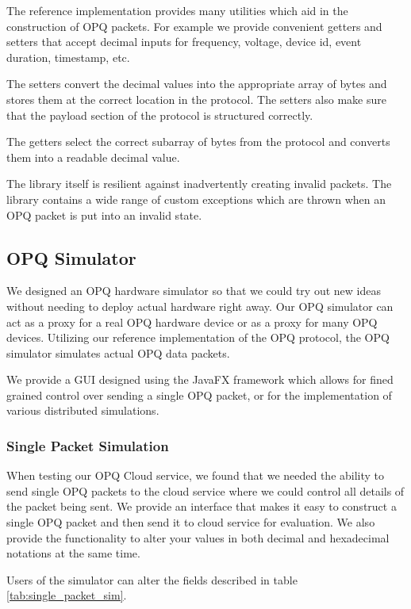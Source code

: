 \documentclass[11pt]{article}
\begin{document}
The reference implementation provides many utilities which aid in the construction of OPQ packets. For example we provide convenient getters and setters that accept decimal inputs for frequency, voltage, device id, event duration, timestamp, etc.

The setters convert the decimal values into the appropriate array of bytes and stores them at the correct location in the protocol. The setters also make sure that the payload section of the protocol is structured correctly. 

The getters select the correct subarray of bytes from the protocol and converts them into a readable decimal value.

The library itself is resilient against inadvertently creating invalid packets. The library contains a wide range of custom exceptions which are thrown when an OPQ packet is put into an invalid state.

\subsection{OPQ Simulator}
We designed an OPQ hardware simulator so that we could try out new ideas without needing to deploy actual hardware right away. Our OPQ simulator can act as a proxy for a real OPQ hardware device or as a proxy for many OPQ devices. Utilizing our reference implementation of the OPQ protocol, the OPQ simulator simulates actual OPQ data packets.

We provide a GUI designed using the JavaFX framework which allows for fined grained control over sending a single OPQ packet, or for the implementation of various distributed simulations.

\subsubsection{Single Packet Simulation}
When testing our OPQ Cloud service, we found that we needed the ability to send single OPQ packets to the cloud service where we could control all details of the packet being sent. We provide an interface that makes it easy to construct a single OPQ packet and then send it to cloud service for evaluation. We also provide the functionality to alter your values in both decimal and hexadecimal notations at the same time.

Users of the simulator can alter the fields described in table \ref{tab:single_packet_sim}.
\end{document}
